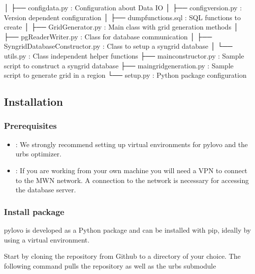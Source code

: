\documentclass[letterpaper,10pt,english]{sphinxmanual}
\begin{document}
\begin{sphinxVerbatim}[commandchars=\\\{\}]
│   ├── config\PYGZus{}data.py :                        Configuration about Data IO
│   ├── config\PYGZus{}version.py :                     Version dependent configuration
│   ├── dump\PYGZus{}functions.sql :                    SQL functions to create
│   ├── GridGenerator.py :                      Main class with grid generation methods
│   ├── pgReaderWriter.py :                     Class for database communication
│   ├── SyngridDatabaseConstructor.py :         Class to setup a syngrid database
│   └── utils.py :                              Class independent helper functions
├── main\PYGZus{}constructor.py :                       Sample script to construct a syngrid database
├── main\PYGZus{}grid\PYGZus{}generation.py :                   Sample script to generate grid in a region
└── setup.py :                                  Python package configuration
\end{sphinxVerbatim}

\sphinxstepscope


\subsection{Installation}
\label{\detokenize{docs_pylovo/installation:installation}}\label{\detokenize{docs_pylovo/installation::doc}}

\subsubsection{Prerequisites}
\label{\detokenize{docs_pylovo/installation:prerequisites}}\begin{itemize}
\item {} 
\sphinxAtStartPar
{}: We strongly recommend setting up virtual environments for pylovo and the urbs optimizer.

\item {} 
\sphinxAtStartPar
{}: If you are working from your own machine you will need a VPN to connect to the MWN network. A connection to the network is necessary for accessing the database server.

\end{itemize}


\subsubsection{Install package}
\label{\detokenize{docs_pylovo/installation:install-package}}
\begin{DUlineblock}{0em}
\item[] pylovo is developed as a Python package and can be installed with pip, ideally by using a virtual environment.
\item[] Start by cloning the repository from Github to a directory of your choice. The following command pulls the repository as well as the urbs submodule
\end{DUlineblock}
\end{document}
